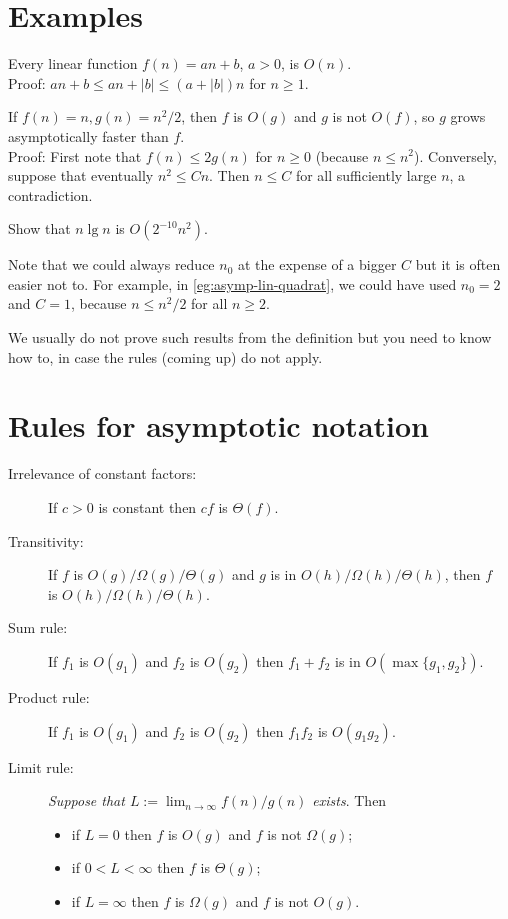 \section{Examples}
\begin{Boxample}
Every linear function $f(n) = an + b$, $a > 0$, is $O(n)$.\\
Proof: $an + b \leq an + |b| \leq (a + |b|) n$ for $n \geq 1$. 
\end{Boxample}

\begin{Boxample} 
\label{eg:asymp-lin-quadrat}
If $f(n) = n, g(n) = n^2/2$, then $f$ is $O(g)$ and $g$ is not
$O(f)$, so $g$ grows asymptotically faster than $f$.\\
Proof: First note that $f(n) \leq 2 g(n)$ for $n \geq 0$ (because $n \leq n^2$). 
Conversely, suppose that eventually $n^2 \leq Cn$. 
Then $n \leq C$ for all sufficiently large $n$, a contradiction.
\end{Boxample}

\begin{Boxample}[4]
Show that $n \lg n$ is $O(2^{-10} n^2)$.
\end{Boxample}

Note that we could always reduce $n_0$ at the expense of a bigger $C$ but 
it is often easier not to. For example, in \cref{eg:asymp-lin-quadrat}, we could have used 
$n_0 = 2$ and $C = 1$, because $n\leq n^2/2$ for all $n\geq 2$.

We usually do not prove such results from the definition but you
need to know how to, in case the rules (coming up) do not apply.

\section{Rules for asymptotic notation}
\begin{description}
\item[Irrelevance of constant factors:] If $c > 0$ is constant then $cf$ is $\Theta(f)$.
\item[Transitivity:] If $f$ is $O(g)/\Omega(g)/\Theta(g)$ and $g$ is 
in $O(h)/\Omega(h)/\Theta(h)$, then $f$\\ is $O(h)/\Omega(h)/\Theta(h)$.
\item[Sum rule:] If $f_1$ is $O(g_1)$ and $f_2$ is $O(g_2)$ then $f_1 + f_2$ is 
in $O(\max\{g_1, g_2\})$.
\item[Product rule:] If $f_1$ is $O(g_1)$ and $f_2$ is $O(g_2)$ then $f_1 f_2$ 
is $O(g_1 g_2)$.
\item[Limit rule:] \emph{Suppose that $L:=\lim_{n\to\infty} f(n)/g(n)$ exists}. 
Then
\begin{itemize}
\item if $L = 0$ then $f$ is $O(g)$ and $f$ is not $\Omega(g)$;
\item if $0 < L < \infty$ then $f$ is $\Theta(g)$;
\item if $L = \infty$ then $f$ is $\Omega(g)$ and $f$ is not $O(g)$.
\end{itemize}
\end{description}

